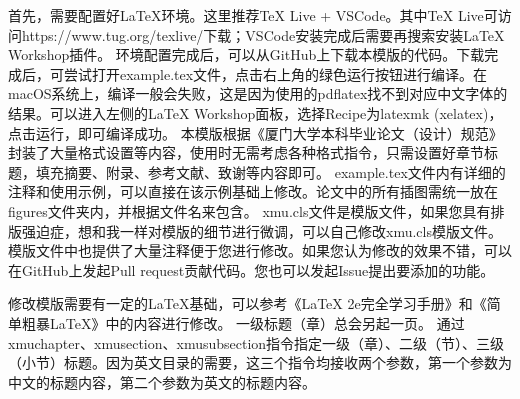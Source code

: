 \documentclass{xmu}
\begin{document}
\tableofcontents


首先，需要配置好LaTeX环境。这里推荐TeX Live + VSCode。其中TeX Live可访问{https://www.tug.org/texlive/}下载；VSCode安装完成后需要再搜索安装LaTeX Workshop插件。
环境配置完成后，可以从GitHub上下载本模版的代码\cite{template}。下载完成后，可尝试打开example.tex文件，点击右上角的绿色运行按钮进行编译。在macOS系统上，编译一般会失败，这是因为使用的pdflatex找不到对应中文字体的结果。可以进入左侧的LaTeX Workshop面板，选择Recipe为latexmk (xelatex)，点击运行，即可编译成功。
本模版根据《厦门大学本科毕业论文（设计）规范》\cite{xmuthesis}封装了大量格式设置等内容，使用时无需考虑各种格式指令，只需设置好章节标题，填充摘要、附录、参考文献、致谢等内容即可。
example.tex文件内有详细的注释和使用示例，可以直接在该示例基础上修改。论文中的所有插图需统一放在figures文件夹内，并根据文件名来包含。
xmu.cls文件是模版文件，如果您具有排版强迫症，想和我一样对模版的细节进行微调，可以自己修改xmu.cls模版文件。模版文件中也提供了大量注释便于您进行修改。如果您认为修改的效果不错，可以在GitHub上\cite{template}发起Pull request贡献代码。您也可以发起Issue提出要添加的功能。
\par
修改模版需要有一定的LaTeX基础，可以参考《LaTeX 2e完全学习手册》\cite{latex2e}和《简单粗暴LaTeX》\cite{easylatex}中的内容进行修改。
一级标题（章）总会另起一页。
通过xmuchapter、xmusection、xmusubsection指令指定一级（章）、二级（节）、三级（小节）标题。因为英文目录的需要，这三个指令均接收两个参数，第一个参数为中文的标题内容，第二个参数为英文的标题内容。
\end{document}
